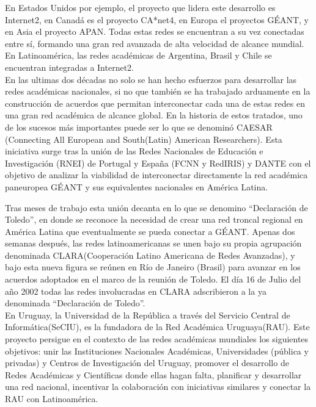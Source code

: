 En Estados Unidos por ejemplo, el proyecto que lidera este desarrollo es Internet2\citep{Internet2}, en Canadá es el proyecto CA*net4\citep{Canarie}, en Europa el proyectos GÉANT\citep{GEANT}, y en Asia el proyecto APAN\citep{APAN}. Todas estas redes se encuentran a su vez conectadas entre sí, formando una gran red avanzada de alta velocidad de alcance mundial. En Latinoamérica, las redes académicas de Argentina, Brasil y Chile se encuentran integradas a Internet2.\\

En las ultimas dos d\'ecadas no solo se han hecho esfuerzos para desarrollar las redes académicas nacionales, si no que también se ha trabajado arduamente en la construcción de acuerdos que permitan interconectar cada una de estas redes en una gran red académica de alcance global. En la historia de estos tratados, uno de los sucesos m\'as importantes puede ser lo que se denomin\'o CAESAR (Connecting All European and South(Latin) American Researchers). Esta iniciativa surge tras la unión de las Redes Nacionales de Educación e Investigación (RNEI) de Portugal y España (FCNN y RedIRIS) y DANTE con el objetivo de analizar la viabilidad de interconectar directamente la red académica paneuropea GÉANT y sus equivalentes nacionales en América Latina.


Tras meses de trabajo esta unión decanta en lo que se denomino “Declaración de Toledo”, en donde se reconoce la necesidad de crear una red troncal regional en América Latina que eventualmente se pueda conectar a GÉANT. Apenas dos semanas después, las redes latinoamericanas se unen bajo su propia agrupación denominada CLARA(Cooperación Latino Americana de Redes Avanzadas), y bajo esta nueva figura se reúnen en Río de Janeiro (Brasil) para avanzar en los acuerdos adoptados en el marco de la reunión de Toledo. El día 16 de Julio del año 2002 todas las redes involucradas en CLARA adscribieron a la ya denominada “Declaración de Toledo”.\\

En Uruguay, la Universidad de la República a través del Servicio Central de Informática(SeCIU), es la fundadora de la Red Académica Uruguaya(RAU). Este proyecto persigue en el contexto de las redes académicas mundiales los siguientes objetivos: unir las Instituciones Nacionales Académicas, Universidades (pública y privadas) y Centros de Investigación del Uruguay, promover el desarrollo de Redes Académicas y Científicas donde ellas hagan falta, planificar y desarrollar una red nacional, incentivar la colaboración con iniciativas similares y conectar la RAU con Latinoamérica. 

